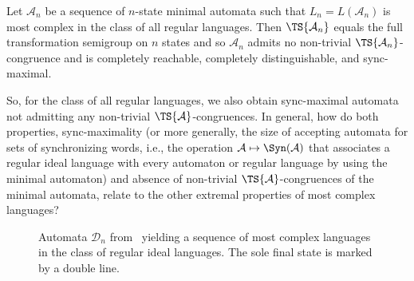 \begin{proposition}
	Let $\mathcal A_n$ be a sequence of $n$-state minimal automata 
	such that $L_n = L(\mathcal A_n)$ is most complex in the class of all regular languages.
	Then $\TS{\mathcal A_n}$ equals the full transformation semigroup on $n$ states and so $\mathcal A_n$
	admits no non-trivial $\TS{\mathcal A_n}$-congruence
    and is completely reachable, completely distinguishable,
	and sync-maximal.	
\end{proposition}

So, for the class of all regular languages, we also obtain 
sync-maximal automata not admitting any non-trivial $\TS{\mathcal A}$-congruences.
In general, how do both properties, sync-maximality (or more generally,
the size of accepting automata for sets of synchronizing words, i.e., the operation $\mathcal A \mapsto \Syn(\mathcal A)$ that associates a regular ideal language with every automaton or regular language by using the minimal automaton) 
and absence of non-trivial $\TS{\mathcal A}$-congruences of the minimal automata, relate
to the other extremal properties of most complex languages? 

\begin{figure}[ht]
	\centering 	
{}
	\caption[Sequence of most complex languages w.r.t.~regular ideal languages]{Automata $\mathcal D_n$ from~\cite{DBLP:journals/dmtcs/BrzozowskiDL16} yielding a sequence of most complex languages in the class of regular ideal languages. The sole final state is marked by a double line.}
	\label{syncmax:fig:most-complex-ideals}
\end{figure}

